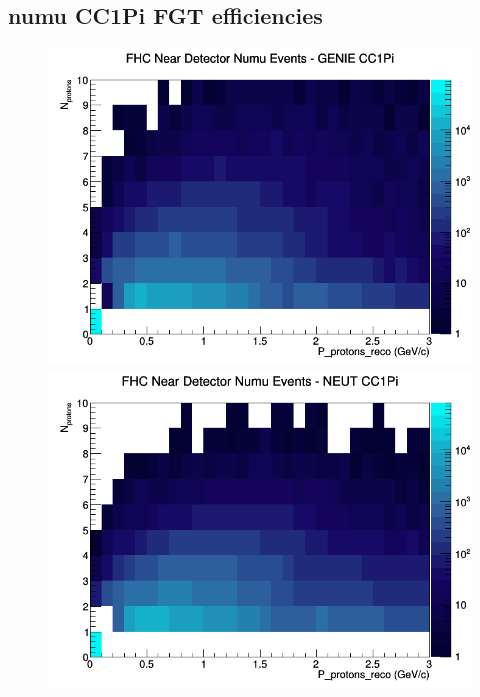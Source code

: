 \documentclass[12pt]{article}
\begin{document}
\subsection{numu CC1Pi FGT efficiencies}
\begin{figure}[h]
\includegraphics[width=\linewidth]{eff_N_P/FGT/protons/CC1Pi_FHC_ND_numu_N_P_GENIE.png}
\endminipage
{}
\includegraphics[width=\linewidth]{eff_N_P/FGT/protons/CC1Pi_FHC_ND_numu_N_P_NEUT.png}
\endminipage
{}

\end{figure}
\end{document}

